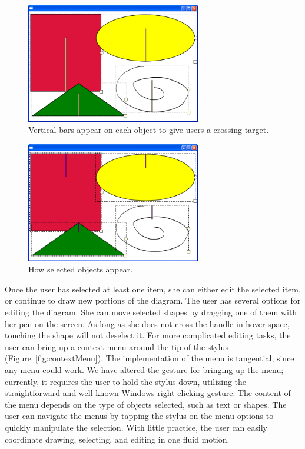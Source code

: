 \documentclass{article}
\begin{document}
\begin{figure}[tb]
\includegraphics[width=3.0in]{SelectionHandlesOn}
\caption{Vertical bars appear on each object to give users a crossing
  target.} 
\label{fig:handles}
\end{figure}

\begin{figure}[tb]
\includegraphics[width=3.0in]{SelectedObjects}
\caption{How selected objects appear.}
\label{fig:selection}
\end{figure}


Once the user has selected at least one item, she can either edit the
selected item, or continue to draw new portions of the diagram.  The
user has several options for editing the diagram.  She can move
selected shapes by dragging one of them with her pen on the
screen.  As long as she does not cross the handle in hover space,
touching the shape will not deselect it.  For more complicated
editing tasks, the user can bring up a context menu
around the tip of the stylus (Figure~\ref{fig:contextMenu}).  The implementation of the menu is tangential, since any menu could work.  We have altered the gesture for bringing up the menu; currently, it requires the user to hold the stylus down, utilizing the straightforward and well-known Windows right-clicking gesture.  The
content of the menu depends on the type of objects selected, such
as text or shapes.  The user can navigate the menus by tapping the stylus on the menu options to quickly manipulate the selection.  With little
practice, the user can easily coordinate drawing, selecting, and
editing in one fluid motion.
\end{document}
